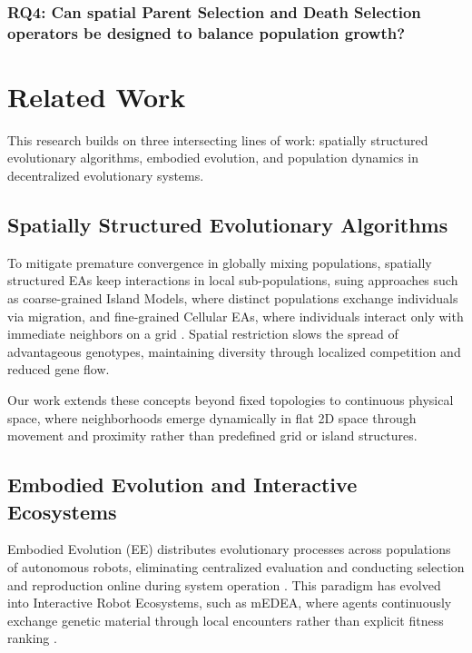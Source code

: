 \documentclass[dvipsnames,format=sigconf,anonymous=false,review=false]{acmart}
\begin{document}
\subsubsection*{RQ4: Can spatial Parent Selection and Death Selection operators be designed to balance population growth?}


\section{Related Work}
This research builds on three intersecting lines of work: spatially structured evolutionary algorithms, embodied evolution, and population dynamics in decentralized evolutionary systems.


\subsection{Spatially Structured Evolutionary Algorithms}
To mitigate premature convergence in globally mixing populations, spatially structured EAs keep interactions in local sub-populations, suing approaches such as coarse-grained Island Models, where distinct populations exchange individuals via migration, and fine-grained Cellular EAs, where individuals interact only with immediate neighbors on a grid \cite{kacprzyk_parallel_2015, skolicki_analysis_2005, kroc_simulating_2010}. Spatial restriction slows the spread of advantageous genotypes, maintaining diversity through localized competition and reduced gene flow.

Our work extends these concepts beyond fixed topologies to continuous physical space, where neighborhoods emerge dynamically in flat 2D space through movement and proximity rather than predefined grid or island structures.



\subsection{Embodied Evolution and Interactive Ecosystems}
Embodied Evolution (EE) distributes evolutionary processes across populations of autonomous robots, eliminating centralized evaluation and conducting selection and reproduction online during system operation \cite{doncieux_new_2011, bredeche_embodied_2018}. This paradigm has evolved into Interactive Robot Ecosystems, such as mEDEA, where agents continuously exchange genetic material through local encounters rather than explicit fitness ranking \cite{9774747}.
\end{document}
